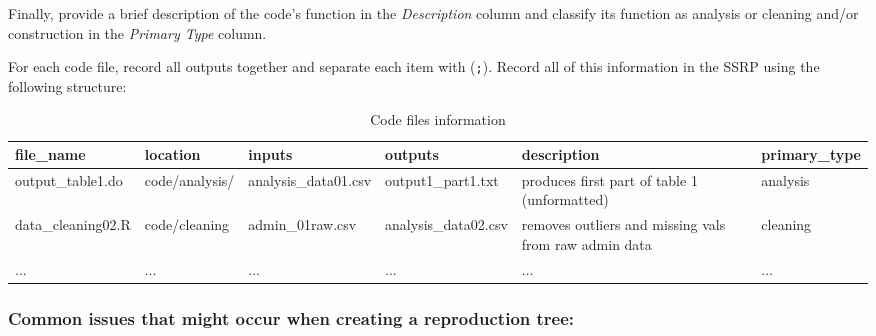 \documentclass[
]{book}
\begin{document}
Finally, provide a brief description of the code's function in the \emph{Description} column and classify its function as analysis or cleaning and/or construction in the \emph{Primary Type} column.

For each code file, record all outputs together and separate each item with (\texttt{;}). Record all of this information in the SSRP using the following structure:

\begin{table}

\caption{\label{tab:code-files-information}Code files information}
\centering
\begin{tabu} to 
\hline
file\_name & location & inputs & outputs & description & primary\_type\\
\hline
output\_table1.do & code/analysis/ & analysis\_data01.csv & output1\_part1.txt & produces first part of table 1 (unformatted) & analysis\\
\hline
data\_cleaning02.R & code/cleaning & admin\_01raw.csv & analysis\_data02.csv & removes outliers and missing vals from raw admin data & cleaning\\
\hline
... & ... & ... & ... & ... & ...\\
\hline
\end{tabu}
\end{table}

\hypertarget{common-issues-that-might-occur-when-creating-a-reproduction-tree}{%
\subsubsection{Common issues that might occur when creating a reproduction tree:}\label{common-issues-that-might-occur-when-creating-a-reproduction-tree}}
\end{document}
